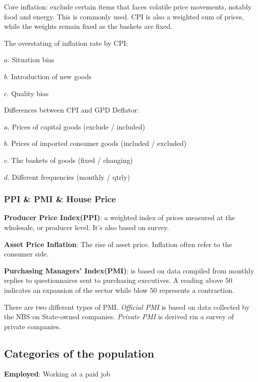 \documentclass[10pt, a4paper]{article}
\begin{document}
            Core inflation: exclude certain items that faces volatile price movements, notably food and energy. This is commonly used.  CPI is also a weighted sum of prices, while the weights remain fixed as the  baskets are fixed. 

            The overstating of inflation rate by CPI:

                $a$. Situation bias
            
                $b$. Introduction of new goods 
            
                $c$. Quality bias
            \newline 

            Differences between CPI and GPD Deflator:

            $a$. Prices of capital goods (exclude / included)
            
            $b$. Prices of imported consumer goods (included / excluded)

            $c$. The baskets of goods (fixed / changing)

            $d$. Different frequencies (monthly / qtrly)

            \subsubsection{PPI \& PMI \& House Price}
            
            \textbf{Producer Price Index(PPI)}: a weighted index of prices measured at the wholesale, or producer level. It's also based on survey. 

            \textbf{Asset Price Inflation}: The rise of asset price. Inflation often refer to the consumer side. 

            \textbf{Purchasing Managers' Index(PMI)}: is based on data compiled from monthly replies to questionnaires sent to purchasing executives. A reading above 50 indicates an expansion of the sector while blow 50 represents a contraction. 

            There are two different types of PMI. \emph{Official PMI} is based on data collected by the NBS on State-owned companies. \emph{Private PMI} is derived rin a survey of private companies. 
            
        \subsection{Categories of the population}  
            \textbf{Employed}: Working at a paid job 
            
\end{document}
